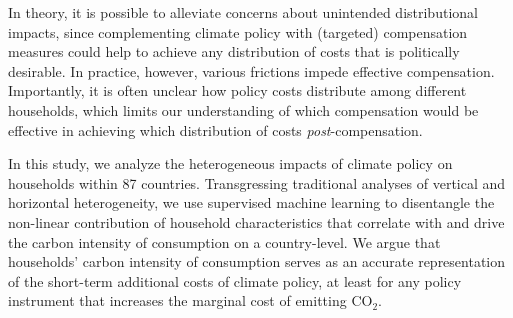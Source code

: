 \documentclass[12pt, a4paper]{article}
\begin{document}
In theory, it is possible to alleviate concerns about unintended distributional impacts, since complementing climate policy with (targeted) compensation measures could help to achieve any distribution of costs that is politically desirable. In practice, however, various frictions impede effective compensation. Importantly, it is often unclear how policy costs distribute among different households, which limits our understanding of which compensation would be effective in achieving which distribution of costs \textit{post}-compensation.


In this study, we analyze the heterogeneous impacts of climate policy on households within 87 countries. Transgressing traditional analyses of vertical and horizontal heterogeneity, we use supervised machine learning to disentangle the non-linear contribution of household characteristics that correlate with and drive the carbon intensity of consumption on a country-level. We argue that households' carbon intensity of consumption serves as an accurate representation of the short-term additional costs of climate policy, at least for any policy instrument that increases the marginal cost of emitting CO$_{2}$.
\end{document}
